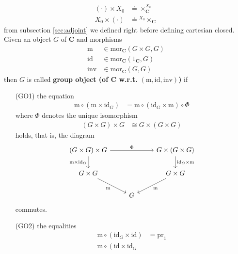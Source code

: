 \begin{exa}
\begin{enumerate}
\begin{align*}
  (\cdot)
  \times
  X_{0}
  &\doteq
  \times_{\mathbf{C}}^{X_{0}}
  \\
  X_{0}
  \times
  (\cdot)
  &\doteq
  {}^{X_{0}}\times_{\mathbf{C}}
\end{align*}
from subsection \ref{sec:adjoint} we defined right before defining  cartesian closed. Given an object $G$ of $\mathbf{C}$ and morphisms
\begin{align*}
  \mathrm{m}
  &\in
  \mathrm{mor}_{\mathbf{C}}
  \left(
    G
    \times
    G,
    G
  \right)
  \\
  \mathrm{id}
  &\in
  \mathrm{mor}_{\mathbf{C}}
  \left(
    1_{\mathbf{C}},
    G
  \right)
  \\
  \mathrm{inv}
  &\in
  \mathrm{mor}_{\mathbf{C}}
  \left(
    G,
    G
  \right)
\end{align*}
then $G$ is called \textbf{group object (of $\mathbf{C}$ w.r.t. $(\mathrm{m},\mathrm{id},\mathrm{inv})$)} if
\begin{enumerate}
\item[(GO1)]
the equation
\begin{align*}
  \mathrm{m}
  \circ
  \left(
    \mathrm{m}
    \times
    \mathrm{id}_{G}
  \right)
  &=
  \mathrm{m}
  \circ
  \left(
    \mathrm{id}_{G}
    \times
    \mathrm{m}
  \right)
  \circ
  \Phi
\end{align*}
where $\Phi$ denotes the unique isomorphism
\begin{align*}
  \left(
    G
    \times
    G
  \right)
  \times
  G
  &\cong
  G
  \times
  \left(
    G
    \times
    G
  \right)
\end{align*}
holds, that is, the diagram
\[
\begin{tikzcd}[sep=normal]
  (G \times G)
  \times
  G
  \arrow{rr}{\Phi}
  \arrow[swap]{d}{\mathrm{m} \times \mathrm{id}_{G}}
  &
  &
  G
  \times
  (G \times G)
  \arrow{d}{\mathrm{id}_{G} \times \mathrm{m}}
  \\
  G
  \times
  G
  \arrow[swap]{dr}{\mathrm{m}}
  &
  &
  G
  \times
  G
  \arrow{dl}{\mathrm{m}}
  \\
  &
  G
  &
\end{tikzcd}
\]
commutes.
\item[(GO2)]
the equalities
\begin{align*}
  \mathrm{m}
  \circ
  \left(
    \mathrm{id}_{G}
    \times
    \mathrm{id}
  \right)
  &=
  \mathrm{pr}_{1}
  \\
  \mathrm{m}
  \circ
  \left(
    \mathrm{id}
    \times
    \mathrm{id}_{G}

\end{align*}
\end{enumerate}
\end{enumerate}
\end{exa}
